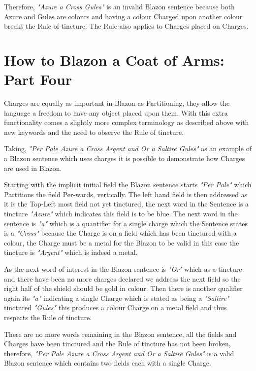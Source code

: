 Therefore, \emph{"Azure a Cross Gules"} is an invalid Blazon sentence because both Azure and Gules are colours and having a colour Charged upon another colour breaks the Rule of tincture.  The Rule also applies to Charges placed on Charges. 





\section{How to Blazon a Coat of Arms: Part Four}

Charges are equally as important in Blazon as Partitioning, they allow the language a freedom to have any object placed upon them. With this extra functionality comes a slightly more complex terminology as described above with new keywords and the need to observe the Rule of tincture.  

Taking, \emph{"Per Pale Azure a Cross Argent and Or a Saltire Gules"} as an example of a Blazon sentence which uses charges it is possible to demonstrate how Charges are used in Blazon.  

Starting with the implicit initial field the Blazon sentence starts \emph{"Per Pale"} which Partitions the field Per-wards, vertically. The left hand field is then addressed as it is the Top-Left most field not yet tinctured, the next word in the Sentence is a tincture \emph{"Azure"} which indicates this field is to be blue.  The next word in the sentence is \emph{"a"} which is a quantifier for a single charge which the Sentence states is a \emph{"Cross"} because the Charge is on a field which has been tinctured with a colour, the Charge must be a metal for the Blazon to be valid in this case the tincture is \emph{"Argent"} which is indeed a metal.  

As the next word of interest in the Blazon sentence is \emph{"Or"} which as a tincture and there have been no more charges declared we address the next field so the right half of the shield should be gold in colour. Then there is another qualifier again its \emph{"a"} indicating a single Charge which is stated as being a \emph{"Saltire"} tinctured \emph{"Gules"} this produces a colour Charge on a metal field and thus respects the Rule of tincture.  

There are no more words remaining in the Blazon sentence, all the fields and Charges have been tinctured and the Rule of tincture has not been broken, therefore, \emph{"Per Pale Azure a Cross Argent and Or a Saltire Gules"} is a valid Blazon sentence which contains two fields each with a single Charge. 


